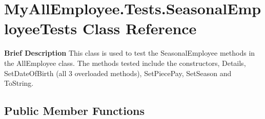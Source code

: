 \hypertarget{class_my_all_employee_1_1_tests_1_1_seasonal_employee_tests}{}\section{My\+All\+Employee.\+Tests.\+Seasonal\+Employee\+Tests Class Reference}
\label{class_my_all_employee_1_1_tests_1_1_seasonal_employee_tests}


{\bfseries  Brief Description} This class is used to test the Seasonal\+Employee methods in the All\+Employee class. The methods tested include the constructors, Details, Set\+Date\+Of\+Birth (all 3 overloaded methods), Set\+Piece\+Pay, Set\+Season and To\+String.  


\subsection*{Public Member Functions}
